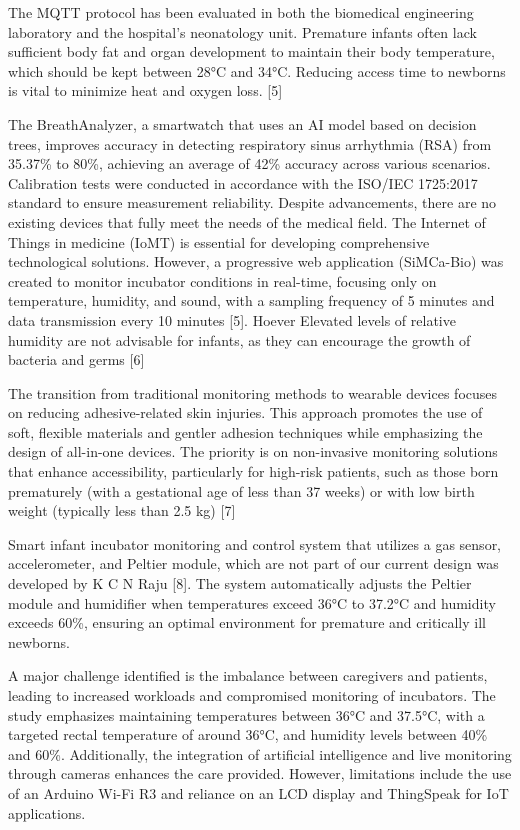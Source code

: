 \documentclass{article}
\begin{document}
The MQTT protocol has been evaluated in both the biomedical engineering
laboratory and the hospital's neonatology unit. Premature infants often
lack sufficient body fat and organ development to maintain their body
temperature, which should be kept between 28°C and 34°C. Reducing access
time to newborns is vital to minimize heat and oxygen loss. {[}5{]}

The BreathAnalyzer, a smartwatch that uses an AI model based on decision
trees, improves accuracy in detecting respiratory sinus arrhythmia (RSA)
from 35.37\% to 80\%, achieving an average of 42\% accuracy across
various scenarios. Calibration tests were conducted in accordance with
the ISO/IEC 1725:2017 standard to ensure measurement reliability.
Despite advancements, there are no existing devices that fully meet the
needs of the medical field. The Internet of Things in medicine (IoMT) is
essential for developing comprehensive technological solutions. However,
a progressive web application (SiMCa-Bio) was created to monitor
incubator conditions in real-time, focusing only on temperature,
humidity, and sound, with a sampling frequency of 5 minutes and data
transmission every 10 minutes {[}5{]}. Hoever Elevated levels of
relative humidity are not advisable for infants, as they can encourage
the growth of bacteria and germs {[}6{]}

The transition from traditional monitoring methods to wearable devices
focuses on reducing adhesive-related skin injuries. This approach
promotes the use of soft, flexible materials and gentler adhesion
techniques while emphasizing the design of all-in-one devices. The
priority is on non-invasive monitoring solutions that enhance
accessibility, particularly for high-risk patients, such as those born
prematurely (with a gestational age of less than 37 weeks) or with low
birth weight (typically less than 2.5 kg) {[}7{]}

Smart infant incubator monitoring and control system that utilizes a gas
sensor, accelerometer, and Peltier module, which are not part of our
current design was developed by K C N Raju {[}8{]}. The system
automatically adjusts the Peltier module and humidifier when
temperatures exceed 36°C to 37.2°C and humidity exceeds 60\%, ensuring
an optimal environment for premature and critically ill newborns.

A major challenge identified is the imbalance between caregivers and
patients, leading to increased workloads and compromised monitoring of
incubators. The study emphasizes maintaining temperatures between 36°C
and 37.5°C, with a targeted rectal temperature of around 36°C, and
humidity levels between 40\% and 60\%. Additionally, the integration of
artificial intelligence and live monitoring through cameras enhances the
care provided. However, limitations include the use of an Arduino Wi-Fi
R3 and reliance on an LCD display and ThingSpeak for IoT applications.
\end{document}
